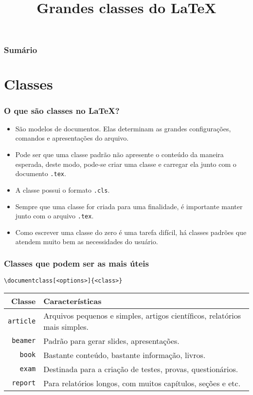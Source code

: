 \documentclass[brazilian]{beamer}
\title{Grandes classes do \LaTeX}
\begin{document}
\frame{\titlepage}

\begin{frame}
    \frametitle{Sumário}
    \tableofcontents
\end{frame}

\section{Classes}

\begin{frame}[fragile]
    \frametitle{O que são classes no \LaTeX?}
    
    \begin{itemize}
        \item São modelos de documentos. Elas determinam as grandes configurações, comandos e apresentações do arquivo.
        \item Pode ser que uma classe padrão não apresente o conteúdo da maneira esperada, deste modo, pode-se criar uma classe e carregar ela junto com o documento \lstinline[style=myStyleLatex]!.tex!.
        \item A classe possui o formato \lstinline[style=myStyleLatex]!.cls!.
        \item Sempre que uma classe for criada para uma finalidade, é importante manter junto com o arquivo \lstinline[style=myStyleLatex]!.tex!.
        \item Como escrever uma classe do zero é uma tarefa difícil, há classes padrões que atendem muito bem as necessidades do usuário.
    \end{itemize}
    
\end{frame}

\begin{frame}[fragile]
    \frametitle{Classes que podem ser as mais úteis}
    \begin{lstlisting}[style=myStyleLatex]
    \documentclass[<options>]{<class>}
\end{lstlisting}
    \begin{tabularx}{\textwidth}{rX}
        \hline
        \textbf{Classe}        & \textbf{Características}                                                   \\ \hline
        \lstinline[style=myStyleLatex]!article! & Arquivos pequenos e simples, artigos científicos, relatórios mais simples. \\ \hline
        \lstinline[style=myStyleLatex]!beamer! & Padrão para gerar slides, apresentações.                                   \\ \hline
        \lstinline[style=myStyleLatex]!book! & Bastante conteúdo, bastante informação, livros.                            \\ \hline
        \lstinline[style=myStyleLatex]!exam! & Destinada para a criação de testes, provas, questionários.                 \\ \hline
        \lstinline[style=myStyleLatex]!report! & Para relatórios longos, com muitos capítulos, seções e etc.                \\ \hline
    \end{tabularx}
\end{frame}
\end{document}
